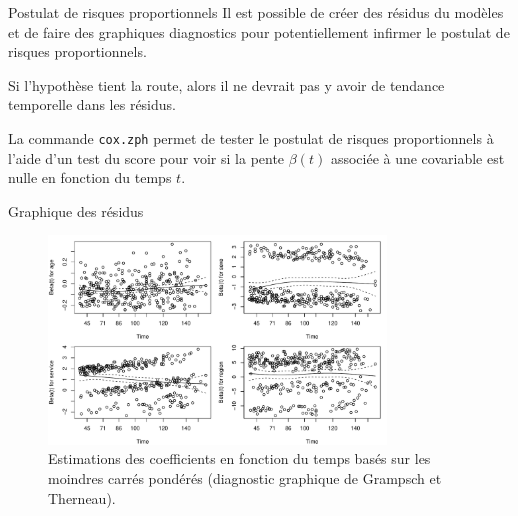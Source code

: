 \documentclass[
  ignorenonframetext,
]{beamer}
\begin{document}
\begin{frame}[fragile]{Postulat de risques proportionnels}
\protect\hypertarget{postulat-de-risques-proportionnels}{}
Il est possible de créer des résidus du modèles et de faire des
graphiques diagnostics pour potentiellement infirmer le postulat de
risques proportionnels.

Si l'hypothèse tient la route, alors il ne devrait pas y avoir de
tendance temporelle dans les résidus.

La commande \texttt{cox.zph} permet de tester le postulat de risques
proportionnels à l'aide d'un test du score pour voir si la pente
\(\beta(t)\) associée à une covariable est nulle en fonction du temps
\(t\).
\end{frame}

\begin{frame}{Graphique des résidus}
\protect\hypertarget{graphique-des-ruxe9sidus}{}
\begin{figure}

{\centering \includegraphics[width=0.8\textwidth,height=\textheight]{MATH60602-diapos9_files/figure-beamer/fig-coxph-hypothese-1.pdf}

}

\caption{\label{fig-coxph-hypothese}Estimations des coefficients en
fonction du temps basés sur les moindres carrés pondérés (diagnostic
graphique de Grampsch et Therneau).}

\end{figure}
\end{frame}
\end{document}
